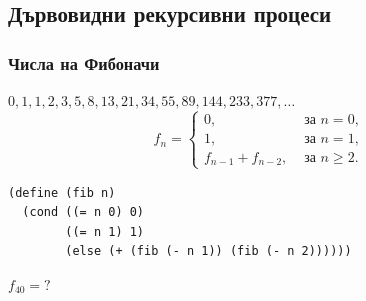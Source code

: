 \documentclass[alsotrans,beameroptions={aspectratio=169}]{beamerswitch}
\begin{document}
\subsection{Дървовидни рекурсивни процеси}

\begin{frame}[fragile]
  \frametitle{Числа на Фибоначи}

  $0, 1, 1, 2, 3, 5, 8, 13, 21, 34, 55, 89, 144, 233, 377, \ldots$\\
  \pause
  \begin{equation*}
    f_n =
    \begin{cases}
      0, &\text{ за }n = 0,\\
      1, &\text{ за }n = 1,\\
      f_{n-1} + f_{n-2}, &\text{ за }n \geq 2.
    \end{cases}
  \end{equation*}
  \pause
\begin{lstlisting}
(define (fib n)
  (cond ((= n 0) 0)
        ((= n 1) 1)
        (else (+ (fib (- n 1)) (fib (- n 2))))))
\end{lstlisting}
  \pause
  $f_{40} = ?$
\end{frame}
\end{document}
